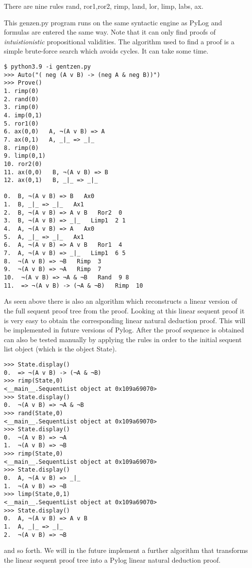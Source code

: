 \documentclass[a4paper,12pt,leqno]{article}
\numberwithin{equation}{section}
\begin{document}
There are nine rules rand, ror1,ror2, rimp, land, lor, limp, labs, ax.

This genzen.py program runs on the same syntactic engine as PyLog and formulas are entered the same way. Note that it can only find proofs of \emph{intuistionistic} propositional validities.
The  algorithm  used to find a proof is a simple brute-force search which avoids cycles. It can take some time.

\begin{verbatim}
$ python3.9 -i gentzen.py
>>> Auto("( neg (A v B) -> (neg A & neg B))")
>>> Prove()
1. rimp(0)
2. rand(0)
3. rimp(0)
4. imp(0,1)
5. ror1(0)
6. ax(0,0)   A, ¬(A v B) => A
7. ax(0,1)   A, _|_ => _|_
8. rimp(0)
9. limp(0,1)
10. ror2(0)
11. ax(0,0)   B, ¬(A v B) => B
12. ax(0,1)   B, _|_ => _|_

0.  B, ¬(A v B) => B   Ax0  
1.  B, _|_ => _|_   Ax1  
2.  B, ¬(A v B) => A v B   Ror2  0 
3.  B, ¬(A v B) => _|_   Limp1  2 1 
4.  A, ¬(A v B) => A   Ax0  
5.  A, _|_ => _|_   Ax1  
6.  A, ¬(A v B) => A v B   Ror1  4 
7.  A, ¬(A v B) => _|_   Limp1  6 5 
8.  ¬(A v B) => ¬B   Rimp  3 
9.  ¬(A v B) => ¬A   Rimp  7 
10.  ¬(A v B) => ¬A & ¬B   Rand  9 8 
11.  => ¬(A v B) -> (¬A & ¬B)   Rimp  10 
\end{verbatim}

As seen above there  is also an algorithm which reconstructs a linear version of the full sequent proof tree from the proof. Looking at this
linear sequent proof it is very easy to obtain the corresponding linear natural deduction proof. This will be implemented in future versions of Pylog.
After the  proof sequence  is obtained can also be tested manually by applying the rules in order to the initial
sequent list object (which is the object State).

\begin{verbatim}
>>> State.display()
0.  => ¬(A v B) -> (¬A & ¬B)
>>> rimp(State,0)
<__main__.SequentList object at 0x109a69070>
>>> State.display()
0.  ¬(A v B) => ¬A & ¬B
>>> rand(State,0)
<__main__.SequentList object at 0x109a69070>
>>> State.display()
0.  ¬(A v B) => ¬A
1.  ¬(A v B) => ¬B
>>> rimp(State,0)
<__main__.SequentList object at 0x109a69070>
>>> State.display()
0.  A, ¬(A v B) => _|_
1.  ¬(A v B) => ¬B
>>> limp(State,0,1)
<__main__.SequentList object at 0x109a69070>
>>> State.display()
0.  A, ¬(A v B) => A v B
1.  A, _|_ => _|_
2.  ¬(A v B) => ¬B
\end{verbatim}

and so forth. We will in the future implement a further algorithm that transforms the linear sequent proof tree into a Pylog linear natural deduction proof.
\end{document}
